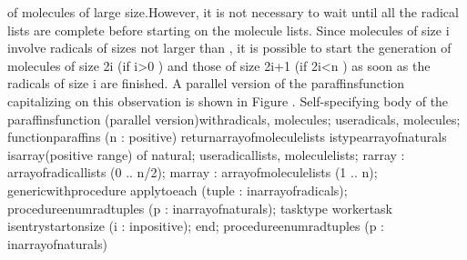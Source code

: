 of molecules of large size.\NtEndntpar[]\NtEndfoot[] However, it is
not necessary to wait until all the radical lists are complete before
starting on the molecule lists. Since molecules of size %
\InlEqn[]\LmthEqn[]i
\LmthEndeqn[]\EndInlEqn[] involve radicals of sizes not larger than %
\InlEqn[]\LmthEqn[]
\left{}
\right\rfloor 
\LmthEndeqn[]\EndInlEqn[], it is possible to start the generation of molecules
of size \InlEqn[]\LmthEqn[]2i
\LmthEndeqn[]\EndInlEqn[] (if \InlEqn[]\LmthEqn[]i>0
\LmthEndeqn[]\EndInlEqn[]) and those
of size \InlEqn[]\LmthEqn[]2i+1
\LmthEndeqn[]\EndInlEqn[] (if \InlEqn[]\LmthEqn[]2i<n
\LmthEndeqn[]\EndInlEqn[]) as soon as
the radicals of size \InlEqn[]\LmthEqn[]i
\LmthEndeqn[]\EndInlEqn[] are finished. A parallel
version of the \tyxffmxmono[]paraffins\tyxffmxendmono[] function capitalizing
on this observation is shown in Figure .
\Parbox[]
Self-specifying body
of the \tyxffmxmono[]paraffins\tyxffmxendmono[] function (parallel
version)\FgEndcap[]
\Comp[]\tyxtstxbf[]with\tyxtstxendbf[] radicals, molecules;
\tyxtstxbf[]use\tyxtstxendbf[]  radicals, molecules;
\tyxtstxbf[]function\tyxtstxendbf[] paraffins (n : positive) %
\tyxtstxbf[]return\tyxtstxendbf[] array\Symuns[]of\Symuns[]molecule\Symuns[]lists %
\tyxtstxbf[]is\tyxtstxendbf[]
   \tyxtstxbf[]type\tyxtstxendbf[] array\Symuns[]of\Symuns[]naturals %
\tyxtstxbf[]is\tyxtstxendbf[] \tyxtstxbf[]array\tyxtstxendbf[] (positive %
\tyxtstxbf[]range\tyxtstxendbf[] \Symlt[]\Symgt[]) \tyxtstxbf[]of%
\tyxtstxendbf[] natural;
   \tyxtstxbf[]use\tyxtstxendbf[] radical\Symuns[]lists, molecule\Symuns[]lists;
   r\Symuns[]array : array\Symuns[]of\Symuns[]radical\Symuns[]lists  (0 .. n/2);
   m\Symuns[]array : array\Symuns[]of\Symuns[]molecule\Symuns[]lists (1 .. n);
   \tyxtstxbf[]generic\tyxtstxendbf[]
      \tyxtstxbf[]with\tyxtstxendbf[] \tyxtstxbf[]procedure%
\tyxtstxendbf[] apply\Symuns[]to\Symuns[]each (tuple : %
\tyxtstxbf[]in\tyxtstxendbf[] array\Symuns[]of\Symuns[]radicals);
   \tyxtstxbf[]procedure\tyxtstxendbf[] enum\Symuns[]rad\Symuns[]tuples (p : %
\tyxtstxbf[]in\tyxtstxendbf[] array\Symuns[]of\Symuns[]naturals);
   \tyxtstxbf[]task\tyxtstxendbf[] type worker\Symuns[]task %
\tyxtstxbf[]is\tyxtstxendbf[]
      \tyxtstxbf[]entry\tyxtstxendbf[] start\Symuns[]on\Symuns[]size (i : %
\tyxtstxbf[]in\tyxtstxendbf[] positive);
   \tyxtstxbf[]end\tyxtstxendbf[];
   \tyxtstxbf[]procedure\tyxtstxendbf[] enum\Symuns[]rad\Symuns[]tuples (p : %
\tyxtstxbf[]in\tyxtstxendbf[] array\Symuns[]of\Symuns[]naturals)  %
